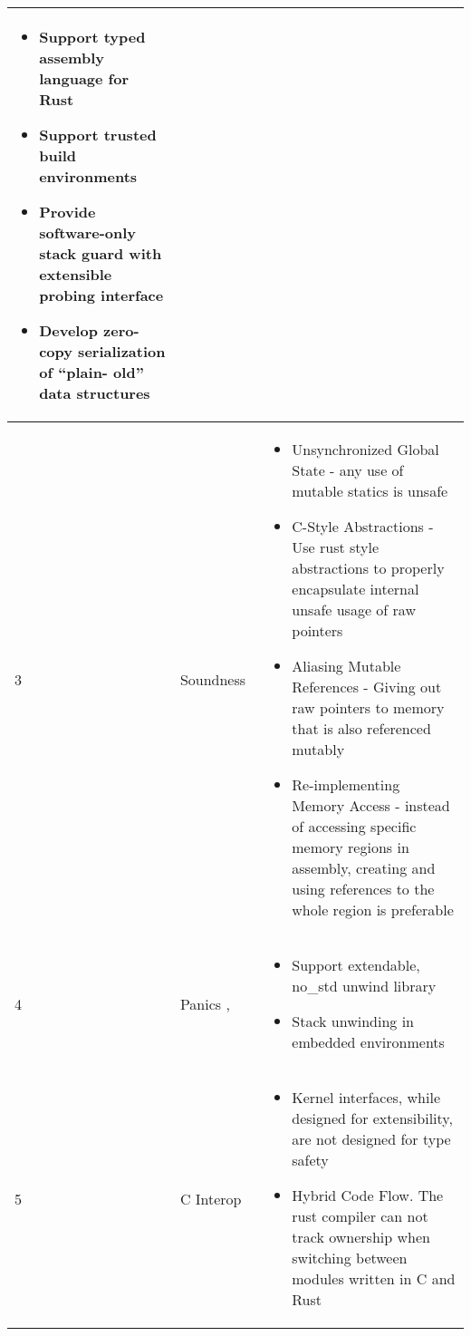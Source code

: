 \documentclass[sigconf]{acmart}
\begin{document}
\begin{table*}[htbp]
\begin{tabular}{p{1cm} p{5cm} p{10cm}}
\begin{itemize}
            \item Support typed assembly language for Rust
            \item Support trusted build environments 
            \item Provide software-only stack guard with extensible probing interface
            \item Develop zero-copy serialization of “plain- old” data structures
        \end{itemize}
        \\
        \hline
        3 & Soundness~\cite{Klimt2023-ob} &
        \begin{itemize}
            \item Unsynchronized Global State - any use of mutable statics is unsafe
            \item C-Style Abstractions - Use rust style abstractions to properly encapsulate internal unsafe usage of raw pointers
            \item Aliasing Mutable References - Giving out raw pointers to memory that is also referenced mutably
            \item Re-implementing Memory Access - instead of accessing specific memory regions in assembly, creating and using references to the whole region is preferable
        \end{itemize}
        \\
        \hline
        4 & Panics \cite{Ma2023-ef},\cite{Burtsev2021-mh} &
        \begin{itemize}
            \item Support extendable, no\_std unwind library
            \item Stack unwinding in embedded environments
        \end{itemize}
        \\
        \hline
        5 & C Interop \cite{Miller2019-xm} &
        \begin{itemize}
            \item Kernel interfaces, while designed for extensibility, are not designed for type safety
            \item Hybrid Code Flow. The rust compiler can not track ownership when switching between modules written in C and Rust
        \end{itemize}
        \\
    \hline
  \end{tabular}
  \caption{Challenges Unique to the Rust Programming Language}
    \label{tab:RQ3}
\end{table*}
\end{document}

